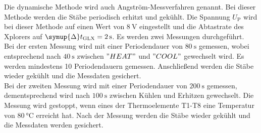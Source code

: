     Die dynamische Methode wird auch Angström-Messverfahren genannt.
    Bei dieser Methode werden die Stäbe periodisch erhitzt und gekühlt.
    Die Spannung $U_\text{P}$ wird bei dieser Methode auf einen Wert von $\SI{8}{\volt}$ eingestellt
    und die Abtastrate des Xplorers auf $\symup{\Delta} t_\text{GLX} = \SI{2}{\second}$.
    Es werden zwei Messungen durchgeführt.\\
    Bei der ersten Messung wird mit einer Periodendauer von $\SI{80}{\second}$ gemessen, wobei
    entsprechend nach $\SI{40}{\second}$ zwischen $"HEAT"$ und $"COOL"$ gewechselt wird.
    Es werden mindestens 10 Periodendauern gemessen.
    Anschließend werden die Stäbe wieder gekühlt und die Messdaten gesichert.\\
    Bei der zweiten Messung wird mit einer Periodendauer von $\SI{200}{\second}$ gemessen,
    dementsprechend wird nach $\SI{100}{\second}$ zwischen Kühlen und Erhitzen gewechselt.
    Die Messung wird gestoppt, wenn eines der Thermoelemente T1-T8 eine Temperatur von $\SI{80}{\celsius}$
    erreicht hat.
    Nach der Messung werden die Stäbe wieder gekühlt und die Messdaten werden gesichert.